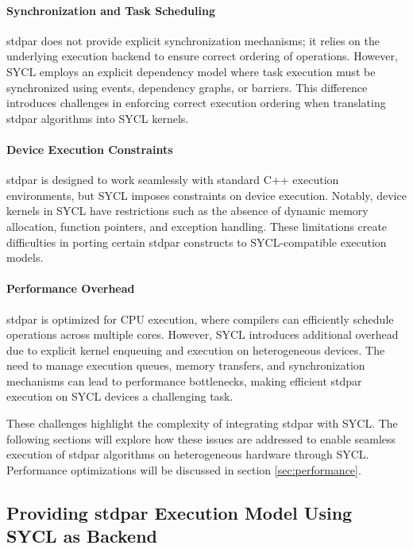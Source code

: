 \paragraph{Synchronization and Task Scheduling} 
stdpar does not provide explicit synchronization mechanisms; it relies on the underlying execution backend to
ensure correct ordering of operations. However, SYCL employs an explicit dependency model where task execution
must be synchronized using events, dependency graphs, or barriers. This difference introduces challenges in
enforcing correct execution ordering when translating stdpar algorithms into SYCL kernels.

\paragraph{Device Execution Constraints} 
stdpar is designed to work seamlessly with standard C++ execution environments, but SYCL imposes constraints
on device execution. Notably, device kernels in SYCL have restrictions such as the absence of dynamic memory
allocation, function pointers, and exception handling. These limitations create difficulties in porting certain stdpar
constructs to SYCL-compatible execution models.

\paragraph{Performance Overhead} 
stdpar is optimized for CPU execution, where compilers can efficiently schedule operations across multiple cores.
However, SYCL introduces additional overhead due to explicit kernel enqueuing and execution on heterogeneous
devices. The need to manage execution queues, memory transfers, and synchronization mechanisms can lead to
performance bottlenecks, making efficient stdpar execution on SYCL devices a challenging task.

These challenges highlight the complexity of integrating stdpar with SYCL. The following sections will explore how
these issues are addressed to enable seamless execution of stdpar algorithms on heterogeneous hardware
through SYCL. Performance optimizations will be discussed in section \ref{sec:performance}.






\subsection{Providing stdpar Execution Model Using SYCL as Backend}
\label{sec:stdpar_to_sycl}


